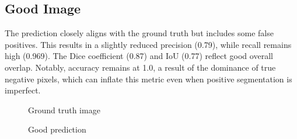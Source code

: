 \documentclass[openany, 12pt]{article}
\begin{document}
\subsection*{Good Image}
The prediction closely aligns with the ground truth but includes some false positives. This results in a slightly reduced precision (0.79), while recall remains high (0.969). The Dice coefficient (0.87) and IoU (0.77) reflect good overall overlap. Notably, accuracy remains at 1.0, a result of the dominance of true negative pixels, which can inflate this metric even when positive segmentation is imperfect.
\begin{figure}[htbp]
	\centering
	\begin{minipage}{0.47\textwidth}
		\centering
		\caption{Ground truth image}
	\end{minipage}
	\hspace{0.01\textwidth}
	\begin{minipage}{0.47\textwidth}
		\centering
		\caption{Good prediction}
	\end{minipage}
\end{figure}
\end{document}
